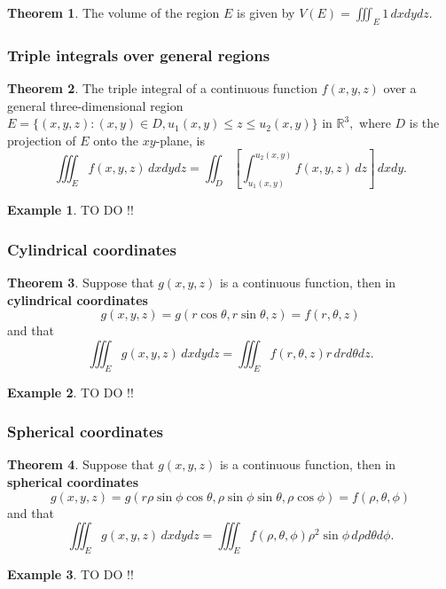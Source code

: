 \documentclass[12pt, a4paper]{article}
\newcommand{\bb}[1]{\mathbb{#1}}
\theoremstyle{definition}
\newtheorem{theorem}{Theorem}[section]
\newtheorem*{example}{Example}
\theoremstyle{plain}
\begin{document}
\begin{theorem}
The volume of the region $E$ is given by $V(E)=\iiint_E 1 \, dxdydz.$
\end{theorem}

\subsubsection{Triple integrals over general regions}

\begin{theorem}
The triple integral of a continuous function $f(x,y,z)$ over a general three-dimensional region $E=\{(x,y,z):(x,y)\in D, u_1(x,y) \leq z \leq u_2(x,y)\}$ in $\bb{R}^3,$ where $D$ is the projection of $E$ onto the $xy$-plane, is $$\iiint_E f(x,y,z) \, dxdydz =\iint_D\left[\int_{u_1(x,y)}^{u_2(x,y)} f(x,y,z) \, dz\right] \, dxdy.$$ 
\end{theorem}

\begin{example}
TO DO !!
\end{example}

\subsubsection{Cylindrical coordinates}

\begin{theorem}
Suppose that $g(x,y,z)$ is a continuous function, then in \textbf{cylindrical coordinates} $$g(x,y,z)=g(r\cos\theta, r\sin\theta, z) =f(r,\theta,z)$$ and that $$\iiint_E g(x,y,z) \, dxdydz =\iiint_E f(r,\theta,z) r \, drd\theta dz.$$
\end{theorem}

\begin{example}
TO DO !!
\end{example}

\subsubsection{Spherical coordinates}

\begin{theorem}
Suppose that $g(x,y,z)$ is a continuous function, then in \textbf{spherical coordinates} $$g(x,y,z)=g(r\rho\sin\phi\cos\theta, \rho\sin\phi\sin\theta, \rho\cos\phi) =f(\rho,\theta,\phi)$$ and that $$\iiint_E g(x,y,z) \, dxdydz =\iiint_E f(\rho,\theta,\phi) \rho^2\sin\phi \, d\rho d\theta d\phi.$$
\end{theorem}

\begin{example}
TO DO !!
\end{example}
\end{document}
